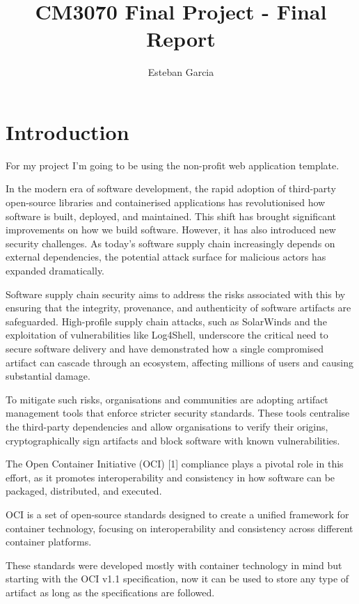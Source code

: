 \documentclass{article}
\title{CM3070 Final Project - Final Report}
\author{Esteban Garcia}
\date{ }
\begin{document}
  \maketitle

  \tableofcontents

  \newpage
  \section{Introduction}

  For my project I'm going to be using the non-profit web application template.

  In the modern era of software development, the rapid adoption of third-party open-source libraries and containerised applications has revolutionised how software is built, deployed, and maintained. This shift has brought significant improvements on how we build software. However, it has also introduced new security challenges. As today's software supply chain increasingly depends on external dependencies, the potential attack surface for malicious actors has expanded dramatically.

  Software supply chain security aims to address the risks associated with this by ensuring that the integrity, provenance, and authenticity of software artifacts are safeguarded. High-profile supply chain attacks, such as SolarWinds and the exploitation of vulnerabilities like Log4Shell, underscore the critical need to secure software delivery and have demonstrated how a single compromised artifact can cascade through an ecosystem, affecting millions of users and causing substantial damage.

  To mitigate such risks, organisations and communities are adopting artifact management tools that enforce stricter security standards. These tools centralise the third-party dependencies and allow organisations to verify their origins, cryptographically sign artifacts and block software with known vulnerabilities.

  The Open Container Initiative (OCI) [1] compliance plays a pivotal role in this effort, as it promotes interoperability and consistency in how software can be packaged, distributed, and executed.

  OCI is a set of open-source standards designed to create a unified framework for container technology, focusing on interoperability and consistency across different container platforms.

  These standards were developed mostly with container technology in mind but starting with the OCI v1.1 specification, now it can be used to store any type of artifact as long as the specifications are followed.
\end{document}
